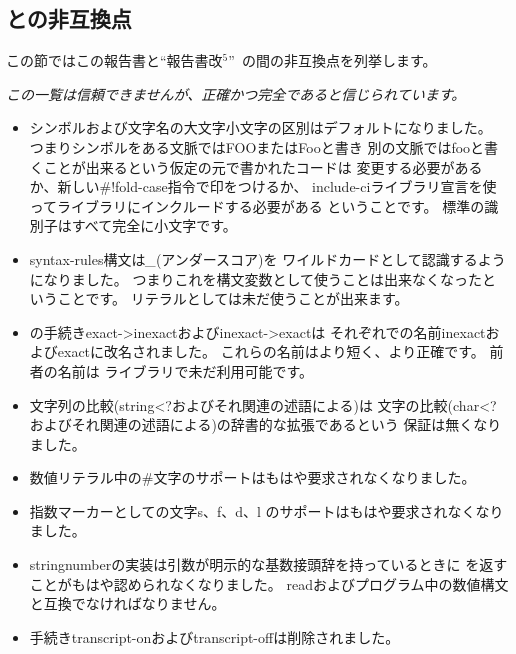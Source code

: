 

\subsection*{\rfivers との非互換点}
\label{incompatibilities}

この節ではこの報告書と``報告書改$^5$''~\cite{R5RS}の間の非互換点を列挙します。

{\em この一覧は信頼できませんが、正確かつ完全であると信じられています。}


\begin{itemize}

\item シンボルおよび文字名の大文字小文字の区別はデフォルトになりました。
つまりシンボルをある文脈では{\cf FOO}または{\cf Foo}と書き
別の文脈では{\cf foo}と書くことが出来るという仮定の元で書かれたコードは
変更する必要があるか、新しい{\cf \#!fold-case}指令で印をつけるか、
{\cf include-ci}ライブラリ宣言を使ってライブラリにインクルードする必要がある
ということです。
標準の識別子はすべて完全に小文字です。

\item {\cf syntax-rules}構文は{\em \_}(アンダースコア)を
ワイルドカードとして認識するようになりました。
つまりこれを構文変数として使うことは出来なくなったということです。
リテラルとしては未だ使うことが出来ます。

\item \rfivers の手続き{\cf exact->inexact}および{\cf inexact->exact}は
それぞれ\rsixrs での名前{\cf inexact}および{\cf exact}に改名されました。
これらの名前はより短く、より正確です。
前者の名前は \rfivers ライブラリで未だ利用可能です。

\item 文字列の比較({\cf string<?}およびそれ関連の述語による)は
文字の比較({\cf char<?}およびそれ関連の述語による)の辞書的な拡張であるという
保証は無くなりました。

\item 数値リテラル中の\#文字のサポートはもはや要求されなくなりました。

\item 指数マーカーとしての文字{\cf s}、{\cf f}、{\cf d}、{\cf l}
のサポートはもはや要求されなくなりました。

\item {\cf string\coerce{}number}の実装は引数が明示的な基数接頭辞を持っているときに
\schfalse{}を返すことがもはや認められなくなりました。
{\cf read}およびプログラム中の数値構文と互換でなければなりません。

\item 手続き{\cf transcript-on}および{\cf transcript-off}は削除されました。

\end{itemize}

